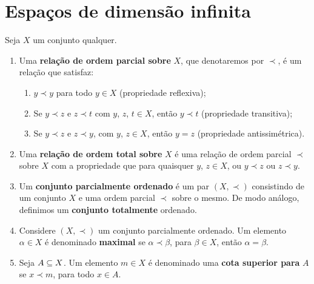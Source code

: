 \section{Espa\c{c}os de dimens\~ao infinita} %
\label{sec:espacos_de_dimensao_infinita}
\begin{definicao}
	Seja $X$ um conjunto qualquer.
	\begin{enumerate}
		\item Uma \textbf{rela\c{c}\~ao de ordem parcial sobre} $X$, que denotaremos por $\prec$, \'e um rela\c{c}\~ao que satisfaz:
		\begin{enumerate}
			\item $y\prec y$ para todo $y \in X$ (propriedade reflexiva);
			\item Se $y\prec z$ e $z\prec t$ com $y$, $z$, $t \in X$, ent\~ao $y\prec t$ (propriedade transitiva);
			\item Se $y\prec z$ e $z\prec y$, com $y$, $z \in X$, ent\~ao $y = z$ (propriedade antissim\'etrica).
		\end{enumerate}
		\item Uma \textbf{rela\c{c}\~ao de ordem total sobre} $X$ \'e uma rela\c{c}\~ao de ordem parcial $\prec$ sobre $X$ com  a propriedade que para quaisquer $y$, $z \in X$, ou $y\prec z$ ou $z\prec y$.
		\item Um \textbf{conjunto parcialmente ordenado} \'e um par $(X, \prec)$ consistindo de um conjunto $X$ e uma ordem parcial $\prec$ sobre o mesmo. De modo an\'alogo, definimos um \textbf{conjunto totalmente} ordenado.
		\item Considere $(X, \prec)$ um conjunto parcialmente ordenado. Um elemento $\alpha \in X$ \'e denominado \textbf{maximal} se $\alpha \prec \beta$, para $\beta \in X$, ent\~ao $\alpha = \beta$.
		\item Seja $A \subseteq X$. Um elemento $m \in X$ \'e denominado uma \textbf{cota superior para} $A$ se $x \prec m$, para todo $x \in A$.
	\end{enumerate}
\end{definicao}

